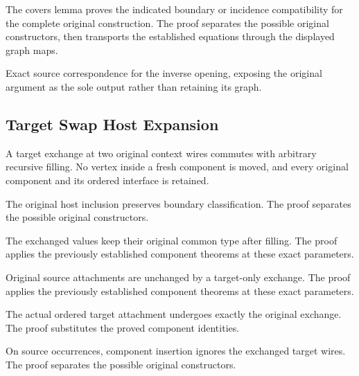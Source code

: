 The covers lemma proves the indicated boundary or incidence compatibility for the complete original construction.
The proof separates the possible original constructors, then transports the established equations through the displayed graph maps.
\par{}

Exact source correspondence for the inverse opening, exposing the
original argument as the sole output rather than retaining its graph.
\par{}

\subsection{Target Swap Host Expansion}
A target exchange at two original context wires commutes with arbitrary
recursive filling. No vertex inside a fresh component is moved, and every
original component and its ordered interface is retained.

The original host inclusion preserves boundary classification.
The proof separates the possible original constructors.
\par{}

The exchanged values keep their original common type after filling.
The proof applies the previously established component theorems at these exact parameters.
\par{}

Original source attachments are unchanged by a target-only exchange.
The proof applies the previously established component theorems at these exact parameters.
\par{}

The actual ordered target attachment undergoes exactly the original exchange.
The proof substitutes the proved component identities.
\par{}

On source occurrences, component insertion ignores the exchanged target wires.
The proof separates the possible original constructors.
\par{}

